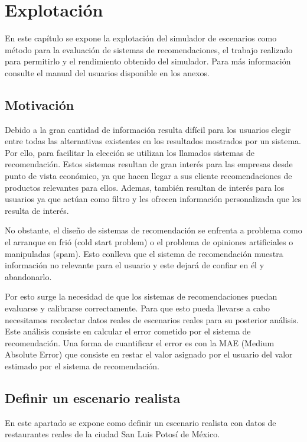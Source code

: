 \chapter{Explotación}

En este capítulo se expone la explotación del simulador de escenarios como método para la evaluación de sistemas de recomendaciones, el trabajo realizado para permitirlo y el rendimiento obtenido del simulador. Para más información consulte el manual del usuarios disponible en los anexos.

\section{Motivación}

Debido a la gran cantidad de información resulta difícil para los usuarios elegir entre todas las alternativas existentes en los resultados mostrados por un sistema. Por ello, para facilitar la elección se utilizan los llamados sistemas de recomendación. Estos sistemas resultan de gran interés para las empresas desde punto de vista económico, ya que hacen llegar a sus cliente recomendaciones de productos relevantes para ellos. Ademas, también resultan de interés para los usuarios ya que actúan como filtro y les ofrecen información personalizada que les resulta de interés.

No obstante, el diseño de sistemas de recomendación se enfrenta a problema como el arranque en frió (cold
start problem) o el problema de opiniones artificiales o manipuladas (spam). Esto conlleva que el sistema de recomendación muestra información no relevante para el usuario y este dejará de confiar en él y abandonarlo. 

Por esto surge la necesidad de que los sistemas de recomendaciones puedan evaluarse y calibrarse correctamente. Para que esto pueda llevarse a cabo necesitamos recolectar datos reales de escenarios reales para su posterior análisis. Este análisis consiste en calcular el error cometido por el sistema de recomendación. Una forma de cuantificar el error es con la MAE (Medium Absolute Error) que consiste en restar el valor asignado por el usuario del valor estimado por el sistema de recomendación. 

\section{Definir un escenario realista}

En este apartado se expone como definir un escenario realista con datos de restaurantes reales de la ciudad San Luis Potosí de México.

